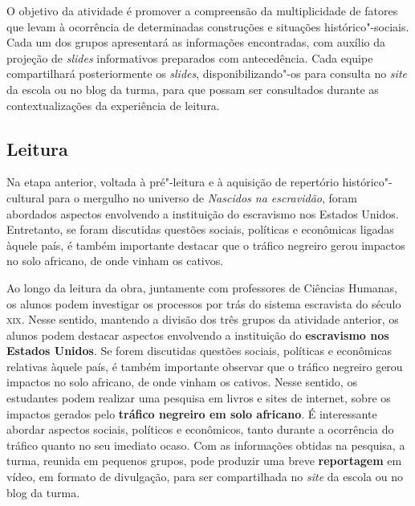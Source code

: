 \documentclass[12pt]{extarticle}
\begin{document}
O objetivo da atividade é promover a compreensão da multiplicidade de
fatores que levam à ocorrência de determinadas construções e situações
histórico"-sociais. Cada um dos grupos apresentará as informações
encontradas, com auxílio da projeção de \emph{slides} informativos
preparados com antecedência. Cada equipe compartilhará posteriormente os
\emph{slides}, disponibilizando"-os para consulta no \emph{site} da
escola ou no blog da turma, para que possam ser consultados durante as
contextualizações da experiência de leitura.

\subsection{Leitura}

Na etapa anterior, voltada à pré"-leitura e à aquisição de
repertório histórico"-cultural para o mergulho no universo de
\emph{Nascidos na escravidão}, foram abordados aspectos envolvendo a
instituição do escravismo nos Estados Unidos. Entretanto, se foram
discutidas questões sociais, políticas e econômicas ligadas àquele país,
é também importante destacar que o tráfico negreiro gerou impactos no
solo africano, de onde vinham os cativos.

Ao longo da leitura da obra, juntamente com professores de Ciências
Humanas, os alunos podem investigar os processos por trás do sistema
escravista do século \textsc{xix}. Nesse sentido, mantendo a divisão dos três
grupos da atividade anterior, os alunos podem destacar aspectos
envolvendo a instituição do \textbf{escravismo nos Estados Unidos}. Se
forem discutidas questões sociais, políticas e econômicas relativas
àquele país, é também importante observar que o tráfico negreiro gerou
impactos no solo africano, de onde vinham os cativos. Nesse sentido, os
estudantes podem realizar uma pesquisa em livros e sites de internet,
sobre os impactos gerados pelo \textbf{tráfico negreiro em solo
africano}. É interessante abordar aspectos sociais, políticos e
econômicos, tanto durante a ocorrência do tráfico quanto no seu imediato
ocaso. Com as informações obtidas na pesquisa, a turma, reunida em
pequenos grupos, pode produzir uma breve \textbf{reportagem} em vídeo,
em formato de divulgação, para ser compartilhada no \emph{site} da
escola ou no blog da turma.
\end{document}
